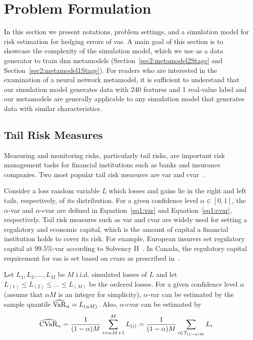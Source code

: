 \section{Problem Formulation} \label{sec2:problem-formulation}

In this section we present notations, problem settings, and a simulation model for risk estimation for hedging errors of \gls{va}s.
A main goal of this section is to showcase the complexity of the simulation model, which we use as a data generator to train \gls{dnn} metamodels (Section~\ref{sec2:metamodel2Stage} and Section~\ref{sec2:metamodel1Stage}).
For readers who are interested in the examination of a neural network metamodel, it is sufficient to understand that our simulation model generates data with 240 features and 1 real-value label and our metamodels are generally applicable to any simulation model that generates data with similar characteristics.

\subsection{Tail Risk Measures}
Measuring and monitoring risks, particularly tail risks, are important risk management tasks for financial institutions such as banks and insurance companies.
Two most popular tail risk measures are \gls{var} and \gls{cvar}~\citep{hardy2022quantitative, rockafellar2002conditional}. 

Consider a loss random variable $L$ which losses and gains lie in the right and left tails, respectively, of its distribution.
For a given confidence level $\alpha\in [0,1]$, the $\alpha$-\gls{var} and $\alpha$-\gls{cvar} are defined in Equation~\eqref{eq1:var} and Equation~\eqref{eq1:cvar}, respectively.
Tail risk measures such as \gls{var} and \gls{cvar} are widely used for setting a regulatory and economic capital, which is the amount of capital a financial institution holds to cover its risk.
For example, European insurers set regulatory capital at $99.5\%$-\gls{var} according to Solvency II~\cite{eiopa2014underlying}.
In Canada, the regulatory capital requirement for \gls{va}s is set based on \gls{cvar}s as prescribed in~\cite{osfi2017life}.

Let $L_1,L_2,\ldots,L_M$ be $M$ i.i.d. simulated losses of $L$ and let $L_{(1)}\leq L_{(2)}\leq \ldots\leq L_{(M)}$ be the ordered losses.
For a given confidence level $\alpha$ (assume that $\alpha M$ is an integer for simplicity), $\alpha$-\gls{var} can be estimated by the sample quantile $\widehat{\mbox{VaR}}_\alpha = L_{(\alpha M)}$. Also, $\alpha$-\gls{cvar} can be estimated by
\begin{equation} \label{eq2:cvar-hat}
    \widehat{\mbox{CVaR}}_\alpha = \frac{1}{(1-\alpha)M} \sum_{i=\alpha M + 1}^{M}L_{(i)} = \frac{1}{(1-\alpha)M} \sum_{i \in \mathcal{T}_{(1-\alpha )M}}L_{i}.
\end{equation}

